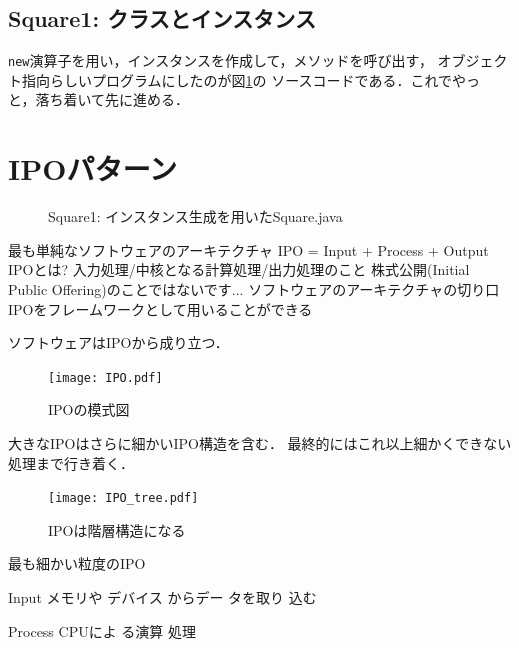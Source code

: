 \documentclass[a4j, twoside]{jsbook}
\begin{document}
\subsection{Square1: クラスとインスタンス}

\texttt{new}演算子を用い，インスタンスを作成して，メソッドを呼び出す，
オブジェクト指向らしいプログラムにしたのが図\ref{fig:Square1:Square}の
ソースコードである．これでやっ
と，落ち着いて先に進める．

\section{IPOパターン}

\begin{figure}
 
 \caption{Square1: インスタンス生成を用いたSquare.java}\label{fig:Square1:Square}
\end{figure}

最も単純なソフトウェアのアーキテクチャ
 IPO = Input + Process + Output
IPOとは?
 入力処理/中核となる計算処理/出力処理のこと
 株式公開(Initial Public Offering)のことではないです...
ソフトウェアのアーキテクチャの切り口
 IPOをフレームワークとして用いることができる

ソフトウェアはIPOから成り立つ．

\begin{figure}
 \begin{center}
  \texttt{[image: IPO.pdf]}
  \caption{IPOの模式図}
 \end{center}
\end{figure}

大きなIPOはさらに細かいIPO構造を含む．
最終的にはこれ以上細かくできない処理まで行き着く．

\begin{figure}
 \begin{center}
  \texttt{[image: IPO\_tree.pdf]}
  \caption{IPOは階層構造になる}
 \end{center}
\end{figure}

最も細かい粒度のIPO

Input
 メモリや
 デバイス
 からデー
タを取り
 込む

Process
 CPUによ
 る演算
 処理
\end{document}
